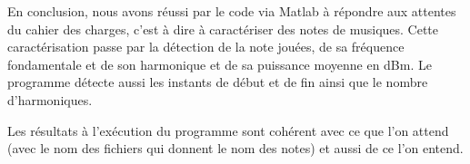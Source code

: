 En conclusion, nous avons réussi par le code via Matlab à répondre aux attentes du cahier des charges, c'est à dire à caractériser des notes de musiques. Cette caractérisation passe par la détection de la note jouées, de sa fréquence fondamentale et de son harmonique et de sa puissance moyenne en dBm. Le programme détecte aussi les instants de début et de fin ainsi que le nombre d'harmoniques.

Les résultats à l'exécution du programme sont cohérent avec ce que l'on attend (avec le nom des fichiers qui donnent le nom des notes) et aussi de ce l'on entend.